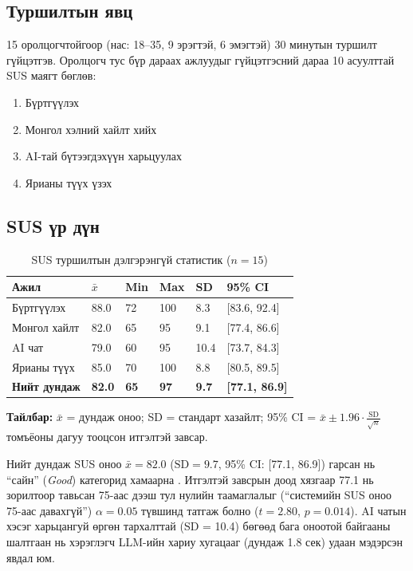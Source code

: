 \documentclass[12pt,a4paper]{report}
\begin{document}
\subsection{Туршилтын явц}

15 оролцогчтойгоор (нас: 18--35, 9 эрэгтэй, 6 эмэгтэй) 30 минутын туршилт гүйцэтгэв. Оролцогч тус бүр дараах ажлуудыг гүйцэтгэсний дараа 10 асуулттай SUS маягт бөглөв:
\begin{enumerate}[leftmargin=1.5cm]
  \item Бүртгүүлэх
  \item Монгол хэлний хайлт хийх
  \item AI-тай бүтээгдэхүүн харьцуулах
  \item Ярианы түүх үзэх
\end{enumerate}

\subsection{SUS үр дүн}

\begin{table}[H]
\centering
\caption{SUS туршилтын дэлгэрэнгүй статистик ($n = 15$)}
\label{tab:sus}
\begin{tabularx}{\textwidth}{@{}lXXXXX@{}}
\toprule
\textbf{Ажил} & \textbf{$\bar{x}$} & \textbf{Min} & \textbf{Max} & \textbf{SD} & \textbf{95\% CI} \\
\midrule
Бүртгүүлэх      & 88.0 & 72 & 100 & 8.3  & [83.6, 92.4] \\
Монгол хайлт    & 82.0 & 65 &  95 & 9.1  & [77.4, 86.6] \\
AI чат          & 79.0 & 60 &  95 & 10.4 & [73.7, 84.3] \\
Ярианы түүх     & 85.0 & 70 & 100 & 8.8  & [80.5, 89.5] \\
\midrule
\textbf{Нийт дундаж} & \textbf{82.0} & \textbf{65} & \textbf{97} & \textbf{9.7} & \textbf{[77.1, 86.9]} \\
\bottomrule
\end{tabularx}
\end{table}

\noindent\textbf{Тайлбар:} $\bar{x}$ = дундаж оноо; SD = стандарт хазайлт; 95\% CI = $\bar{x} \pm 1.96 \cdot \frac{\text{SD}}{\sqrt{n}}$ томъёоны дагуу тооцсон итгэлтэй завсар.

Нийт дундаж SUS оноо $\bar{x} = 82.0$ ($\text{SD} = 9.7$, 95\% CI: [77.1, 86.9]) гарсан нь ``сайн'' (\textit{Good}) категорид хамаарна \cite{brooke1996sus}. Итгэлтэй завсрын доод хязгаар 77.1 нь зорилтоор тавьсан 75-аас дээш тул нулийн таамаглалыг (``системийн SUS оноо 75-аас давахгүй'') $\alpha = 0.05$ түвшинд татгаж болно ($t = 2.80$, $p = 0.014$). AI чатын хэсэг харьцангуй өргөн тархалттай (SD = 10.4) бөгөөд бага оноотой байгааны шалтгаан нь хэрэглэгч LLM-ийн хариу хугацааг (дундаж 1.8 сек) удаан мэдэрсэн явдал юм.
\end{document}
